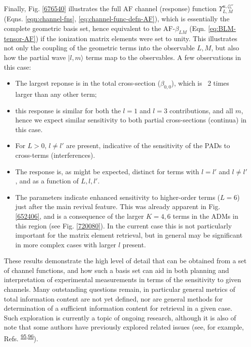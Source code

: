 \documentclass[10pt]{article}
\begin{document}
Finally, Fig. \ref{676540} illustrates the full AF channel (response) function $\varUpsilon_{L,M}^{u,\zeta\zeta'}$ (Eqns. \ref{eqn:channel-fns}, \ref{eq:channel-func-defn-AF}), which is essentially the complete geometric basis set,
hence equivalent to the AF-$\beta_{LM}$ (Eqn. \ref{eq:BLM-tensor-AF}) if the ionization matrix elements were set to unity. This illustrates not only the coupling of the geometric terms into the observable $L,M$, but also how the partial wave $|l,m\rangle$ terms map to the observables. %
A few observations in this case:

\begin{itemize}
\item The largest reponse is in the total cross-section ($\beta_{0,0}$), which is ~2 times larger than any other term; 
\item this response is similar for both the $l=1$ and $l=3$ contributions, and all $m$, hence we expect similar sensitivity to both partial cross-sections (continua) in this case.
\item For $L>0$, $l\neq l'$ are present, indicative of the sensitivity of the PADs to cross-terms (interferences).
\item The response is, as might be expected, distinct for terms with $l=l'$ and $l\neq l'$, and as a function of $L,l,l'$.
\item The parameters indicate enhanced sensitivity to higher-order terms ($L=6$) just after the main revival feature. This was already apparent in Fig. \ref{652406}, and is a consequence of the larger $K=4,6$ terms in the ADMs in this region (see Fig. \ref{720080}). In the current case this is not particularly important for the matrix element retrieval, but in general may be significant in more complex cases with larger $l$ present.

\end{itemize}

These results demonstrate the high level of detail that can be obtained from a set of channel functions, and how such a basis set can aid in both planning and interpretation of experimental measurements in terms of the sensitivity to given channels. Many outstanding questions remain, in particular general metrics of total information content are not yet defined, nor are general methods for determination of a sufficient information content for retrieval in a given case. Such exploration is currently a topic of ongoing research, although it is also of note that some authors have previously explored related issues (see, for example, Refs. \textsuperscript{\hyperref[csl:95]{95},\hyperref[csl:96]{96}}).
\end{document}
